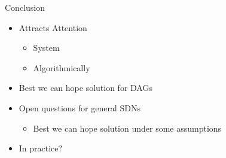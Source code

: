 \begin{frame}[<+->]{Conclusion}
\begin{itemize}
  \item Attracts Attention 
	\begin{itemize}
	  \item System
	  \item Algorithmically
	\end{itemize}
  \item Best we can hope solution for DAGs
  \item Open questions for general SDNs
	\begin{itemize}
  		\item Best we can hope solution under some assumptions
	\end{itemize}
  \item In practice? 
\end{itemize}
\end{frame}